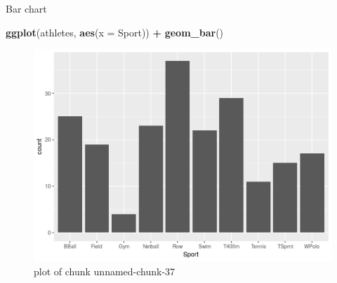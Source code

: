 \documentclass[ignorenonframetext,]{beamer}
\newenvironment{Shaded}{\begin{snugshade}}{\end{snugshade}}
\newcommand{\DataTypeTok}[1]{\textcolor[rgb]{0.13,0.29,0.53}{#1}}
\newcommand{\KeywordTok}[1]{\textcolor[rgb]{0.13,0.29,0.53}{\textbf{#1}}}
\newcommand{\NormalTok}[1]{#1}
\newcommand{\OperatorTok}[1]{\textcolor[rgb]{0.81,0.36,0.00}{\textbf{#1}}}
\newcommand{\StringTok}[1]{\textcolor[rgb]{0.31,0.60,0.02}{#1}}
\begin{document}
\begin{frame}[fragile]{Bar chart}
\protect\hypertarget{bar-chart}{}

\begin{Shaded}
\begin{Highlighting}[]
\KeywordTok{ggplot}\NormalTok{(athletes, }\KeywordTok{aes}\NormalTok{(}\DataTypeTok{x =}\NormalTok{ Sport)) }\OperatorTok{+}\StringTok{ }\KeywordTok{geom_bar}\NormalTok{()}
\end{Highlighting}
\end{Shaded}

\begin{figure}
\centering
\includegraphics{figure/unnamed-chunk-37-1.png}
\caption{plot of chunk unnamed-chunk-37}
\end{figure}

\end{frame}
\end{document}
